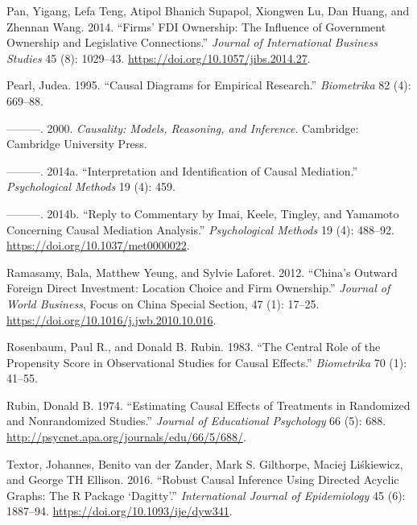 \documentclass[11pt,]{book}
\begin{document}
\leavevmode\hypertarget{ref-pan_firms_2014}{}%
Pan, Yigang, Lefa Teng, Atipol Bhanich Supapol, Xiongwen Lu, Dan Huang, and Zhennan Wang. 2014. ``Firms' FDI Ownership: The Influence of Government Ownership and Legislative Connections.'' \emph{Journal of International Business Studies} 45 (8): 1029--43. \url{https://doi.org/10.1057/jibs.2014.27}.

\leavevmode\hypertarget{ref-pearl_causal_1995}{}%
Pearl, Judea. 1995. ``Causal Diagrams for Empirical Research.'' \emph{Biometrika} 82 (4): 669--88.

\leavevmode\hypertarget{ref-pearl_causality_2000}{}%
---------. 2000. \emph{Causality: Models, Reasoning, and Inference}. Cambridge: Cambridge University Press.

\leavevmode\hypertarget{ref-pearl_interpretation_2014}{}%
---------. 2014a. ``Interpretation and Identification of Causal Mediation.'' \emph{Psychological Methods} 19 (4): 459.

\leavevmode\hypertarget{ref-pearl_reply_2014}{}%
---------. 2014b. ``Reply to Commentary by Imai, Keele, Tingley, and Yamamoto Concerning Causal Mediation Analysis.'' \emph{Psychological Methods} 19 (4): 488--92. \url{https://doi.org/10.1037/met0000022}.

\leavevmode\hypertarget{ref-ramasamy_chinas_2012}{}%
Ramasamy, Bala, Matthew Yeung, and Sylvie Laforet. 2012. ``China's Outward Foreign Direct Investment: Location Choice and Firm Ownership.'' \emph{Journal of World Business}, Focus on China Special Section, 47 (1): 17--25. \url{https://doi.org/10.1016/j.jwb.2010.10.016}.

\leavevmode\hypertarget{ref-rosenbaum_central_1983}{}%
Rosenbaum, Paul R., and Donald B. Rubin. 1983. ``The Central Role of the Propensity Score in Observational Studies for Causal Effects.'' \emph{Biometrika} 70 (1): 41--55.

\leavevmode\hypertarget{ref-rubin_estimating_1974}{}%
Rubin, Donald B. 1974. ``Estimating Causal Effects of Treatments in Randomized and Nonrandomized Studies.'' \emph{Journal of Educational Psychology} 66 (5): 688. \url{http://psycnet.apa.org/journals/edu/66/5/688/}.

\leavevmode\hypertarget{ref-textor_robust_2016}{}%
Textor, Johannes, Benito van der Zander, Mark S. Gilthorpe, Maciej Liśkiewicz, and George TH Ellison. 2016. ``Robust Causal Inference Using Directed Acyclic Graphs: The R Package `Dagitty'.'' \emph{International Journal of Epidemiology} 45 (6): 1887--94. \url{https://doi.org/10.1093/ije/dyw341}.
\end{document}
